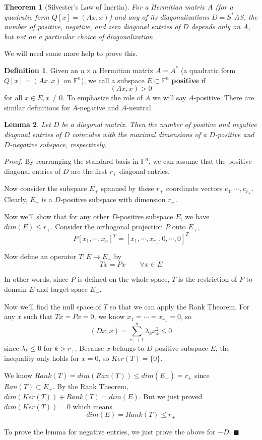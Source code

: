 \documentclass[a4paper,10pt]{book}
\newcommand{\F}{\mathbb{F}}
\theoremstyle{plain}
\newtheorem{theorem}{Theorem}[section]
\theoremstyle{plain}
\newtheorem{lemma}[theorem]{Lemma}
\newenvironment{lproof}{\textsl{Proof.}}{\hfill$\blacksquare$}
\theoremstyle{definition}
\newtheorem{definition}{Definition}[section]
\begin{document}
\begin{theorem}[Silvester's Law of Inertia]
For a Hermitian matrix $A$ (for a quadratic form $Q[x] = (Ax, x)$) and any of its diagonalizations $D = S^{*} AS$, the number of positive, negative, and zero diagonal entries of $D$ depends only on $A$, but not on a particular choice of diagonalization. 
\end{theorem}

We will need some more help to prove this. 

\begin{definition}
Given an $n \times n$ Hermitian matrix $A = A^{*}$ (a quadratic form $Q[x] = (Ax, x)$ on $\F^{n}$), we call a subspace $E \subset \F^{n}$ \textbf{positive} if 
$$(Ax, x) > 0$$ 
for all $x \in E, x \neq 0$. To emphasize the role of $A$ we will say $A$-positive. There are similar definitions for $A$-negative and $A$-neutral. 
\end{definition}

\begin{lemma}
Let $D$ be a diagonal matrix. Then the number of positive and negative diagonal entries of $D$ coincides with the maximal dimensions of a $D$-positive and $D$-negative subspace, respectively. 
\end{lemma}

\begin{lproof}
By rearranging the standard basis in $\F^{n}$, we can assume that the positive diagonal entries of $D$ are the first $r_{+}$ diagonal entries. 

Now consider the subspace $E_{+}$ spanned by these $r_{+}$ coordinate vectors $e_{1}, \cdots, e_{r_{+}}$. Clearly, $E_{+}$ is a $D$-positive subspace with dimension $r_{+}$. 

Now we'll show that for any other $D$-positive subspace $E$, we have $dim(E) \leq r_{+}$. Consider the orthogonal projection $P$ onto $E_{+}$, 
$$P[x_{1}, \cdots, x_{n}]^{T} = [x_{1}, \cdots, x_{r_{+}}, 0, \cdots, 0]^{T}$$

Now define an operator $T: E \rightarrow E_{+}$ by 
$$Tx = Px \qquad \forall x \in E$$

In other words, since $P$ is defined on the whole space, $T$ is the restriction of $P$ to domain $E$ and target space $E_{+}$. 

Now we'll find the null space of $T$ so that we can apply the Rank Theorem. For any $x$ such that $Tx = Px = 0$, we know $x_{1} = \cdots = x_{r_{+}} = 0$, so 
$$(Dx, x) = \sum_{r_{+} + 1}^{n} \lambda_{k} x_{k}^{2} \leq 0$$
since $\lambda_{k} \leq 0$ for $k > r_{+}$. Because $x$ belongs to $D$-positive subspace $E$, the inequality only holds for $x = 0$, so $Ker(T) = \{0\}$. 

We know $Rank(T) = dim(Ran(T)) \leq dim(E_{+}) = r_{+}$ since $Ran(T) \subset	E_{+}$. By the Rank Theorem, $dim(Ker(T)) + Rank(T) = dim(E)$. But we just proved $dim(Ker(T)) = 0$ which means 
$$dim(E) = Rank(T) \leq r_{+}$$

To prove the lemma for negative entries, we just prove the above for $-D$. 
\end{lproof}
\end{document}
